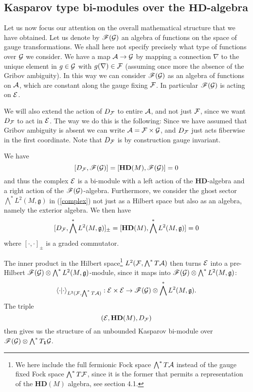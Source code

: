 \documentclass[letterpaper,12pt]{article}
\def\ca{{\cal A}}
\def\ce{{\cal E}}
\def\cf{{\cal F}}
\def\cg{{\cal G}}
\newcommand{\cF}{{\cal F}}
\begin{document}
\subsection{Kasparov type bi-modules over the $\mathbf{HD}$-algebra}

Let us now focus our attention on the overall mathematical structure that we have obtained. Let us denote by 
$
 \mathscr{F} (\cg)  
$
an algebra of functions on the space of gauge transformations. We shall here not specify precisely what type of functions over $\cg$ we consider.   We have a map  $\ca \to \cg$ by mapping a connection $\nabla$ to the unique element in $g\in \cg$ with $g(\nabla ) \in \cF$ (assuming once more the absence of the Gribov ambiguity).  In this way we can consider $ \mathscr{F} (\cg)$ as an algebra of functions on $\ca$, which are constant along the gauge fixing $\cF$. In particular $ \mathscr{F} (\cg)$ is acting on $\ce$.

We will also extend the action of $D_{\cF}$ to entire $\ca$, and not just $\cf$, since we want $D_\cf$ to act in $\ce$. The way we do this is the following: Since we have assumed that Gribov ambiguity is absent we can write $\ca = \cf \times \cg$, and $D_\cf$  just acts fiberwise in the first coordinate. Note that $D_\cf$ is by construction gauge invariant. 


We have
$$
[D_\cf, \mathscr{F} (\cg)]=[\mathbf{HD}(M),\mathscr{F} (\cg)]=0
$$
and thus the complex $\ce$ is a bi-module with a left action of the $\mathbf{HD}$-algebra and a right action of the  $\mathscr{F} (\cg)$-algebra. 
Furthermore, we consider the ghost sector  $\displaystyle{\bigwedge^* L^2(M,\mathfrak{g})}$ in (\ref{complex}) not just as a Hilbert space but also as an algebra, namely the exterior algebra. 
We then have
$$
[D_\cf, \bigwedge^* L^2(M,\mathfrak{g})]_\pm=[\mathbf{HD}(M),\bigwedge^* L^2(M,\mathfrak{g})]=0
$$
where $[\cdot,\cdot]_\pm$ is a graded commutator. 

The inner product in the Hilbert space\footnote{We here include the full fermionic Fock space $\bigwedge^* T\ca$ instead of the gauge fixed Fock space $\bigwedge^* T\cf$, since it is the former that permits a representation of the $\mathbf{HD}(M)$ algebra, see section 4.1. } $L^2(\cf,\bigwedge^* T\ca)$ then turns $\ce$ into a pre-Hilbert $\mathscr{F} (\cg)\otimes \bigwedge^* L^2(M,\mathfrak{g})$-module, since it maps into $\mathscr{F} (\cg)\otimes \bigwedge^* L^2(M,\mathfrak{g})$:
$$
\langle \cdot \vert \cdot \rangle_{L^2(\cf,\bigwedge^* T\ca)} :\ce \times \ce \rightarrow \mathscr{F} (\cg)\otimes \bigwedge^* L^2(M,\mathfrak{g}).
$$
The triple 
$$
(\ce,\mathbf{HD}(M), D_\cf)
$$
then gives us the structure of an unbounded Kasparov bi-module \cite{Kasparov} over $\mathscr{F} (\cg)\otimes \bigwedge^* T_\mathbf{1}\cg$. 
\end{document}
